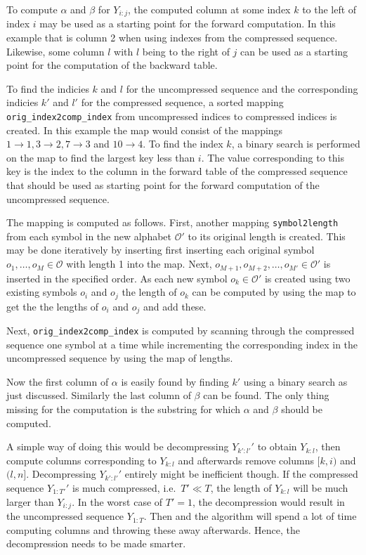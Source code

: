 To compute $\alpha$ and $\beta$ for $Y_{i:j}$, the computed column at some index
$k$ to the left of index $i$ may be used as a starting point for the forward
computation. In this example that is column 2 when using indexes from the
compressed sequence. Likewise, some column $l$ with $l$ being to the right of
$j$ can be used as a starting point for the computation of the backward
table.

To find the indicies $k$ and $l$ for the uncompressed sequence and the
corresponding indicies $k'$ and $l'$ for the compressed sequence, a sorted
mapping \texttt{orig\_index2comp\_index} from uncompressed indices to
compressed indices is created. In this example the map would consist of the
mappings $1 \rightarrow 1, 3 \rightarrow 2, 7 \rightarrow 3$ and
$10 \rightarrow 4$. To find the index $k$, a binary search is performed on the
map to find the largest key less than $i$. The value corresponding to this key
is the index to the column in the forward table of the compressed sequence that
should be used as starting point for the forward computation of the
uncompressed sequence.

The mapping is computed as follows. First, another mapping
\texttt{symbol2length} from each symbol in the new alphabet $\mathcal{O'}$ to
its original length is created. This may be done iteratively by inserting first
inserting each original symbol $o_1, \dots, o_M \in \mathcal{O}$ with length 1
into the map. Next, $o_{M+1}, o_{M+2}, \dots, o_{M'} \in \mathcal{O'}$ is
inserted in the specified order. As each new symbol $o_k \in \mathcal{O'}$ is
created using two existing symbols $o_i$ and $o_j$ the length of $o_k$ can be
computed by using the map to get the the lengths of $o_i$ and $o_j$ and add
these.

Next, \texttt{orig\_index2comp\_index} is computed by scanning through the
compressed sequence one symbol at a time while incrementing the corresponding
index in the uncompressed sequence by using the map of lengths.

Now the first column of $\alpha$ is easily found by finding $k'$ using a binary
search as just discussed. Similarly the last column of $\beta$ can be
found. The only thing missing for the computation is the substring for which
$\alpha$ and $\beta$ should be computed.

A simple way of doing this would be decompressing $Y_{k':l'}'$ to obtain
$Y_{k:l}$, then compute columns corresponding to $Y_{k:l}$ and
afterwards remove columns $[k, i)$ and $(l, n]$. Decompressing $Y_{k':l'}'$
entirely might be inefficient though. If the compressed sequence $Y_{1:T'}'$ is
much compressed, i.e.\ $T' \ll T$, the length of $Y_{k:l}$ will be much larger
than $Y_{i:j}$. In the worst case of $T' = 1$, the decompression would result
in the uncompressed sequence $Y_{1:T}$. Then and the algorithm will spend a lot
of time computing columns and throwing these away afterwards. Hence, the
decompression needs to be made smarter.

